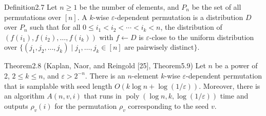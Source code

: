 \begin{authorclaim}{Definition2.7}
Let $n\ge1$ be the number of elements, and $P_n$ be the set of all permutations over $[n]$. A $k$-wise $\varepsilon$-dependent permutation is a distribution $D$ over $P_n$ such that for all $0\le i_1<i_2<\cdots<i_k<n$, the distribution of $(f(i_1),f(i_2),\ldots,f(i_k))$ with $f\leftarrow D$ is $\varepsilon$-close to the uniform distribution over $\{(j_1,j_2,\ldots,j_k)\mid j_1,\ldots,j_k\in[n]\text{ are pairwisely distinct}\}$.
\end{authorclaim}
\begin{authorclaim}{Theorem2.8 (Kaplan, Naor, and Reingold [25], Theorem5.9)}
Let $n$ be a power of 2, $2\le k\le n$, and $\varepsilon>2^{-n}$. There is an $n$-element $k$-wise $\varepsilon$-dependent permutation that is samplable with seed length $O(k\log n+\log(1/\varepsilon))$. Moreover, there is an algorithm $A(n,v,i)$ that runs in $\operatorname{poly}(\log n,k,\log(1/\varepsilon))$ time and outputs $\rho_v(i)$ for the permutation $\rho_v$ corresponding to the seed $v$.
\end{authorclaim}
